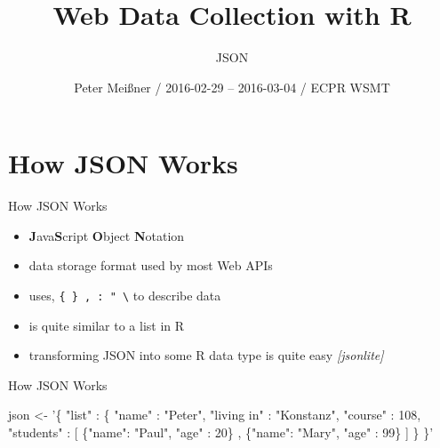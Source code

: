 \documentclass[ignorenonframetext,]{beamer}
\title{Web Data Collection with R}
\subtitle{JSON}
\author{Peter Meißner / 2016-02-29 -- 2016-03-04 / ECPR WSMT}
\date{}
\newenvironment{Shaded}{\begin{snugshade}}{\end{snugshade}}
\newcommand{\StringTok}[1]{\textcolor[rgb]{0.31,0.60,0.02}{{#1}}}
\newcommand{\NormalTok}[1]{{#1}}
\providecommand{\tightlist}{%
  \setlength{\itemsep}{0pt}\setlength{\parskip}{0pt}}
\begin{document}
\frame{\titlepage}

\begin{frame}
\tableofcontents[hideallsubsections]
\end{frame}

\section{How JSON Works}\label{how-json-works}

\begin{frame}[fragile]{How JSON Works}

\begin{itemize}
\tightlist
\item
  \textbf{J}ava\textbf{S}cript \textbf{O}bject \textbf{N}otation
\item
  data storage format used by most Web APIs
\item
  uses, \texttt{\{\ \}\ ,\ :\ "\ \textbackslash{}} to describe data
\item
  is quite similar to a list in R
\item
  transforming JSON into some R data type is quite easy
  \emph{{[}jsonlite{]}}
\end{itemize}

\end{frame}

\begin{frame}[fragile]{How JSON Works}

\begin{Shaded}
\begin{Highlighting}[]
\NormalTok{json <-}\StringTok{ }
\StringTok{'\{}
\StringTok{  "list" : \{}
\StringTok{    "name" : "Peter",}
\StringTok{    "living in" : "Konstanz",}
\StringTok{    "course" : 108, }
\StringTok{    "students" : [ \{"name": "Paul", "age" : 20\} ,}
\StringTok{      \{"name": "Mary", "age" : 99\} }
\StringTok{    ]}
\StringTok{  \}}
\StringTok{\}'}
\end{Highlighting}
\end{Shaded}

\end{frame}
\end{document}
